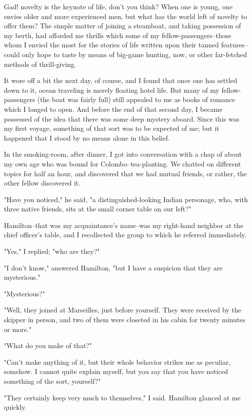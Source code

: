 Gad! novelty is the keynote of life, don't you think? When one is
young, one envies older and more experienced men, but what has the
world left of novelty to offer them? The simple matter of joining a
steamboat, and taking possession of my berth, had afforded me thrills
which some of my fellow-passengers--those whom I envied the most for
the stories of life written upon their tanned features--could only
hope to taste by means of big-game hunting, now, or other far-fetched
methods of thrill-giving.

It wore off a bit the next day, of course, and I found that once one
has settled down to it, ocean traveling is merely floating hotel life.
But many of my fellow-passengers (the boat was fairly full) still
appealed to me as books of romance which I longed to open. And before
the end of that second day, I became possessed of the idea that there
was some deep mystery aboard. Since this was my first voyage,
something of that sort was to be expected of me; but it happened that
I stood by no means alone in this belief.

In the smoking-room, after dinner, I got into conversation with a
chap of about my own age who was bound for Colombo--tea-planting. We
chatted on different topics for half an hour, and discovered that we
had mutual friends, or rather, the other fellow discovered it.

"Have you noticed," he said, "a distinguished-looking Indian
personage, who, with three native friends, sits at the small corner
table on our left?"

Hamilton--that was my acquaintance's name--was my right-hand neighbor
at the chief officer's table, and I recollected the group to which he
referred immediately.

"Yes," I replied; "who are they?"

"I don't know," answered Hamilton, "but I have a suspicion that they
are mysterious."

"Mysterious?"

"Well, they joined at Marseilles, just before yourself. They were
received by the skipper in person, and two of them were closeted in
his cabin for twenty minutes or more."

"What do you make of that?"

"Can't make anything of it, but their whole behavior strikes me as
peculiar, somehow. I cannot quite explain myself, but you say that you
have noticed something of the sort, yourself?"

"They certainly keep very much to themselves," I said. Hamilton
glanced at me quickly.

